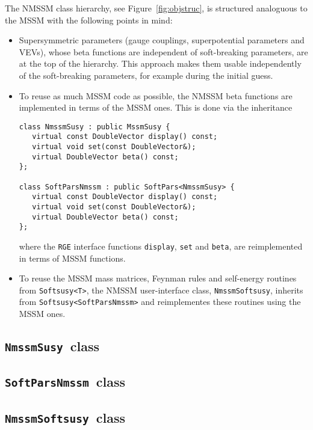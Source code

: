 \documentclass[final,3p,times,pdflatex]{elsarticle}
\def\code#1{\small{\tt #1}\normalsize}
\begin{document}
The NMSSM class hierarchy, see Figure~\ref{fig:objstruc}, is
structured analoguous to the MSSM with the following points in mind:
%
\begin{itemize}
\item Supersymmetric parameters (gauge couplings, superpotential
  parameters and VEVs), whose beta functions are independent of
  soft-breaking parameters, are at the top of the hierarchy.  This
  approach makes them usable independently of the soft-breaking
  parameters, for example during the initial guess.
\item To reuse as much MSSM code as possible, the NMSSM beta functions
  are implemented in terms of the MSSM ones.  This is done via
  the inheritance
\begin{verbatim}
class NmssmSusy : public MssmSusy {
   virtual const DoubleVector display() const;
   virtual void set(const DoubleVector&);
   virtual DoubleVector beta() const;
};

class SoftParsNmssm : public SoftPars<NmssmSusy> {
   virtual const DoubleVector display() const;
   virtual void set(const DoubleVector&);
   virtual DoubleVector beta() const;
};
\end{verbatim}
  where the \code{RGE} interface functions \code{display}, \code{set}
  and \code{beta}, are reimplemented in terms of MSSM functions.
\item To reuse the MSSM mass matrices, Feynman rules and self-energy
  routines from \code{Softsusy<T>}, the NMSSM user-interface class,
  \code{NmssmSoftsusy}, inherits from \code{Softsusy<SoftParsNmssm>}
  and reimplementes these routines using the MSSM ones.
\end{itemize}

\subsection{\code{NmssmSusy}~class}
\label{nmssmsusy}

\subsection{\code{SoftParsNmssm}~class}
\label{nmssmsoftpars}

\subsection{\code{NmssmSoftsusy}~class}
\label{nmssmsoftsusy}
\end{document}
